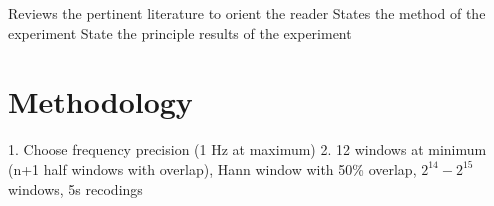 \documentclass{llncs}
\begin{document}
\cite{nascimento_t4pdm_2022}

\cite{wang_bearing_2015}

\cite{jung_vibration_2017}  %


    Reviews the pertinent literature to orient the reader
    States the method of the experiment
    State the principle results of the experiment



\section{Methodology}

1. Choose frequency precision (1 Hz at maximum)
2. 12 windows at minimum (n+1 half windows with overlap), Hann window with 50\% overlap, $2^14 - 2^15$ windows, 5s recodings
\end{document}
